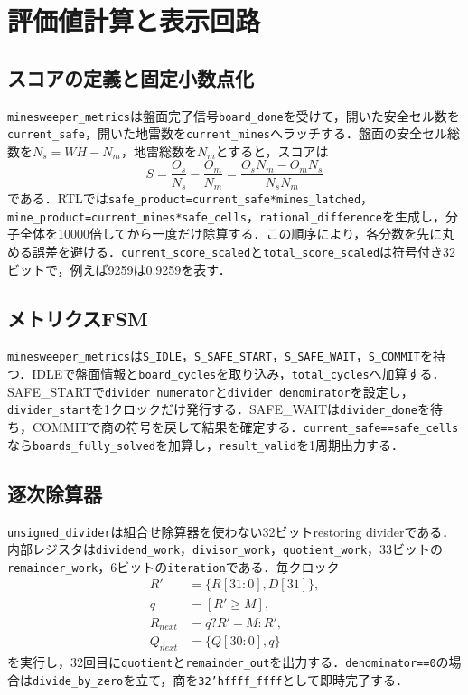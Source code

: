 \chapter{評価値計算と表示回路}
\label{chap:metrics}

\section{スコアの定義と固定小数点化}
\texttt{minesweeper\_metrics}は盤面完了信号\texttt{board\_done}を受けて，開いた安全セル数を\texttt{current\_safe}，開いた地雷数を\texttt{current\_mines}へラッチする．盤面の安全セル総数を\(N_s=WH-N_m\)，地雷総数を\(N_m\)とすると，スコアは
\begin{equation}
 S=\frac{O_s}{N_s}-\frac{O_m}{N_m}
 =\frac{O_sN_m-O_mN_s}{N_sN_m}
\end{equation}
である．RTLでは\texttt{safe\_product=current\_safe*mines\_latched}，\texttt{mine\_product=current\_mines*safe\_cells}，\texttt{rational\_difference}を生成し，分子全体を10000倍してから一度だけ除算する．この順序により，各分数を先に丸める誤差を避ける．\texttt{current\_score\_scaled}と\texttt{total\_score\_scaled}は符号付き32ビットで，例えば9259は0.9259を表す．

\section{メトリクスFSM}
\texttt{minesweeper\_metrics}は\texttt{S\_IDLE}，\texttt{S\_SAFE\_START}，\texttt{S\_SAFE\_WAIT}，\texttt{S\_COMMIT}を持つ．IDLEで盤面情報と\texttt{board\_cycles}を取り込み，\texttt{total\_cycles}へ加算する．SAFE\_STARTで\texttt{divider\_numerator}と\texttt{divider\_denominator}を設定し，\texttt{divider\_start}を1クロックだけ発行する．SAFE\_WAITは\texttt{divider\_done}を待ち，COMMITで商の符号を戻して結果を確定する．\texttt{current\_safe==safe\_cells}なら\texttt{boards\_fully\_solved}を加算し，\texttt{result\_valid}を1周期出力する．

\section{逐次除算器}
\texttt{unsigned\_divider}は組合せ除算器を使わない32ビットrestoring dividerである．内部レジスタは\texttt{dividend\_work}，\texttt{divisor\_work}，\texttt{quotient\_work}，33ビットの\texttt{remainder\_work}，6ビットの\texttt{iteration}である．毎クロック
\begin{align}
 R'&=\{R[31:0],D[31]\},\\
 q&=[R'\geq M],\\
 R_{next}&=q?R'-M:R',\\
 Q_{next}&=\{Q[30:0],q\}
\end{align}
を実行し，32回目に\texttt{quotient}と\texttt{remainder\_out}を出力する．\texttt{denominator==0}の場合は\texttt{divide\_by\_zero}を立て，商を\texttt{32'hffff\_ffff}として即時完了する．

